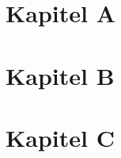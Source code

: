 \documentclass[a4paper, 11pt]{article}
\begin{document}
\begin{comment}
\makeatletter
\renewcommand\listoftables{%
        \@starttoc{lot}%
}
\makeatother

\section*{Tabellenverzeichnis}
\label{sec:tabellenverzeichnis}
\addcontentsline{toc}{section}{\nameref{sec:tabellenverzeichnis}}

\listoftables

\newpage
\end{comment}


\begin{comment}
\section*{Codelistingverzeichnis}
\label{sec:codeverzeichnis}
\addcontentsline{toc}{section}{\nameref{sec:codeverzeichnis}}

\newpage
\end{comment}

\section{Kapitel A}

\Blindtext

\blindtext

\blindtext

\Blindtext

\newpage

\section{Kapitel B}

\Blindtext

\blindtext

\blindtext

\Blindtext

\newpage

\section{Kapitel C}

\Blindtext

\blindtext

\blindtext

\Blindtext
\end{document}
